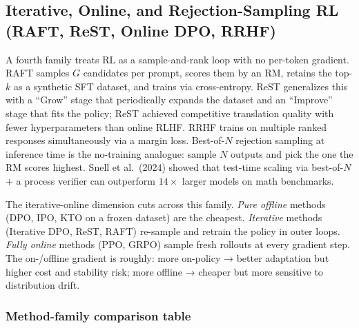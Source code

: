 \documentclass{article}
\begin{document}
\subsection{Iterative, Online, and Rejection-Sampling RL (RAFT, ReST, Online DPO, RRHF)}\label{iterative-online-and-rejection-sampling-rl-raft-rest-online-dpo-rrhf}

A fourth family treats RL as a sample-and-rank loop with no per-token gradient. RAFT \citep{dong2023raftrewardrankedfi} samples \(G\) candidates per prompt, scores them by an RM, retains the top-\(k\) as a synthetic SFT dataset, and trains via cross-entropy. ReST \citep{gulcehre20232023} generalizes this with a ``Grow'' stage that periodically expands the dataset and an ``Improve'' stage that fits the policy; ReST achieved competitive translation quality with fewer hyperparameters than online RLHF. RRHF \citep{yuan2023rrhfrankresponsest} trains on multiple ranked responses simultaneously via a margin loss. Best-of-\(N\) rejection sampling at inference time \citep{stiennon2020learningtosummariz} is the no-training analogue: sample \(N\) outputs and pick the one the RM scores highest. Snell et al.~(2024) showed that test-time scaling via best-of-\(N\) + a process verifier can outperform \(14\times\) larger models on math benchmarks.

The iterative-online dimension cuts across this family. \emph{Pure offline} methods (DPO, IPO, KTO on a frozen dataset) are the cheapest. \emph{Iterative} methods (Iterative DPO, ReST, RAFT) re-sample and retrain the policy in outer loops. \emph{Fully online} methods (PPO, GRPO) sample fresh rollouts at every gradient step. The on-/offline gradient is roughly: more on-policy → better adaptation but higher cost and stability risk; more offline → cheaper but more sensitive to distribution drift.

\subsubsection{Method-family comparison table}\label{method-family-comparison-table}
\end{document}
